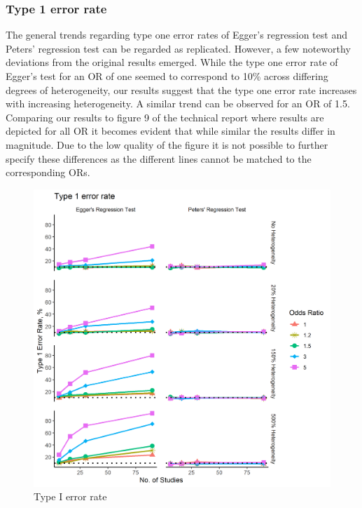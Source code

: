 \documentclass[
  english,
  doc,floatsintext,draftall]{apa6}
\begin{document}
\hypertarget{type-1-error-rate}{%
\subsubsection{Type 1 error rate}\label{type-1-error-rate}}

The general trends regarding type one error rates of Egger's regression test and Peters' regression test can be regarded as replicated. However, a few noteworthy deviations from the original results emerged. While the type one error rate of Egger's test for an OR of one seemed to correspond to 10\% across differing degrees of heterogeneity, our results suggest that the type one error rate increases with increasing heterogeneity. A similar trend can be observed for an OR of 1.5. Comparing our results to figure 9 of the technical report where results are depicted for all OR it becomes evident that while similar the results differ in magnitude. Due to the low quality of the figure it is not possible to further specify these differences as the different lines cannot be matched to the corresponding ORs.

\begin{figure}
\includegraphics[width=400pt]{../figures/type_1_error} \caption{Type I error rate}\label{fig:unnamed-chunk-5}
\end{figure}
\end{document}
